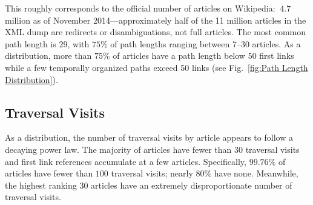 \documentclass[pre,twocolumn,twoside,superscriptaddress,floatfix, aps, 10pt]{revtex4-1}
\begin{document}
This roughly corresponds to the official number of articles on Wikipedia: 
$~4.7$ million as of November 2014---approximately half of the 11 million 
articles in the XML dump are redirects or disambiguations, not full articles.
The most common path length is 29, with $75\%$ of path lengths ranging between 7--30 articles.
As a distribution, more than $75\%$ of articles have a path length below 
$50$ first links 
while a few temporally organized paths exceed 50 links 
(see Fig.~\ref{fig:Path Length Distribution}). 



\subsection{Traversal Visits}

As a distribution, the number of traversal visits by article appears to follow a decaying power law. 
The majority of articles have fewer than 30 traversal visits and
first link references accumulate at a few articles.
Specifically, $99.76\%$ of articles have fewer than $100$ traversal visits; nearly $80\%$ have none. 
Meanwhile, the highest ranking 30 articles have an extremely disproportionate number of traversal visits.
\end{document}
